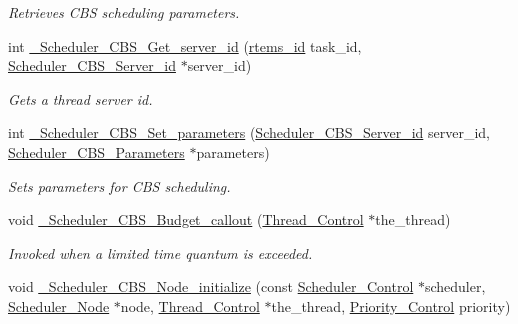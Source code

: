\begin{DoxyCompactItemize}
\begin{DoxyCompactList}\small\item\em Retrieves C\+BS scheduling parameters. \end{DoxyCompactList}\item 
int \mbox{\hyperlink{group__RTEMSScoreSchedulerCBS_ga00f5de4bbf2dd36138965f58675a1673}{\+\_\+\+Scheduler\+\_\+\+C\+B\+S\+\_\+\+Get\+\_\+server\+\_\+id}} (\mbox{\hyperlink{group__ClassicTasks_gab20892b814dced7dd4e5b9bf42becd57}{rtems\+\_\+id}} task\+\_\+id, \mbox{\hyperlink{group__RTEMSScoreSchedulerCBS_gaec8b0a87aaeee5befd176ed946ad60a7}{Scheduler\+\_\+\+C\+B\+S\+\_\+\+Server\+\_\+id}} $\ast$server\+\_\+id)
\begin{DoxyCompactList}\small\item\em Gets a thread server id. \end{DoxyCompactList}\item 
int \mbox{\hyperlink{group__RTEMSScoreSchedulerCBS_gaf899d82926e2d6d83ac1fb6d1072b932}{\+\_\+\+Scheduler\+\_\+\+C\+B\+S\+\_\+\+Set\+\_\+parameters}} (\mbox{\hyperlink{group__RTEMSScoreSchedulerCBS_gaec8b0a87aaeee5befd176ed946ad60a7}{Scheduler\+\_\+\+C\+B\+S\+\_\+\+Server\+\_\+id}} server\+\_\+id, \mbox{\hyperlink{structScheduler__CBS__Parameters}{Scheduler\+\_\+\+C\+B\+S\+\_\+\+Parameters}} $\ast$parameters)
\begin{DoxyCompactList}\small\item\em Sets parameters for C\+BS scheduling. \end{DoxyCompactList}\item 
void \mbox{\hyperlink{group__RTEMSScoreSchedulerCBS_ga4dfdf34a4a2601925b2d5cdbf67d07a9}{\+\_\+\+Scheduler\+\_\+\+C\+B\+S\+\_\+\+Budget\+\_\+callout}} (\mbox{\hyperlink{struct__Thread__Control}{Thread\+\_\+\+Control}} $\ast$the\+\_\+thread)
\begin{DoxyCompactList}\small\item\em Invoked when a limited time quantum is exceeded. \end{DoxyCompactList}\item 
void \mbox{\hyperlink{group__RTEMSScoreSchedulerCBS_gabb8137112e3b30c70daa4dc3221093cb}{\+\_\+\+Scheduler\+\_\+\+C\+B\+S\+\_\+\+Node\+\_\+initialize}} (const \mbox{\hyperlink{struct__Scheduler__Control}{Scheduler\+\_\+\+Control}} $\ast$scheduler, \mbox{\hyperlink{structScheduler__Node}{Scheduler\+\_\+\+Node}} $\ast$node, \mbox{\hyperlink{struct__Thread__Control}{Thread\+\_\+\+Control}} $\ast$the\+\_\+thread, \mbox{\hyperlink{group__RTEMSScorePriority_ga59d02b58072d31a9a1cfe644557aefe2}{Priority\+\_\+\+Control}} priority)

\end{DoxyCompactItemize}
